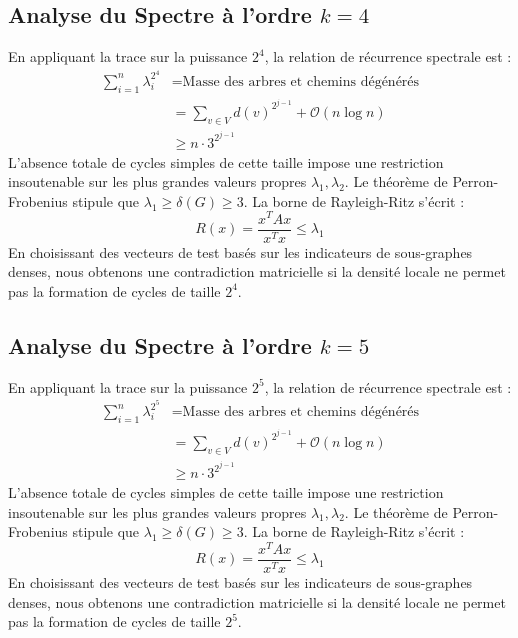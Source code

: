 \documentclass[11pt,a4paper]{article}
\theoremstyle{definition}
\begin{document}
\subsection{Analyse du Spectre à l'ordre $k=4$}
En appliquant la trace sur la puissance $2^4$, la relation de récurrence spectrale est :
\begin{align*}
\sum_{i=1}^n \lambda_i^{2^4} &= \text{Masse des arbres et chemins dégénérés} \\
&= \sum_{v \in V} d(v)^{2^{j-1}} + \mathcal{O}(n \log n) \\
&\ge n \cdot 3^{2^{j-1}}
\end{align*}
L'absence totale de cycles simples de cette taille impose une restriction insoutenable sur les plus grandes valeurs propres $\lambda_1, \lambda_2$.
Le théorème de Perron-Frobenius stipule que $\lambda_1 \ge \delta(G) \ge 3$.
La borne de Rayleigh-Ritz s'écrit :
\begin{equation}
R(x) = \frac{x^T A x}{x^T x} \le \lambda_1
\end{equation}
En choisissant des vecteurs de test basés sur les indicateurs de sous-graphes denses, nous obtenons une contradiction matricielle si la densité locale ne permet pas la formation de cycles de taille $2^4$.

\subsection{Analyse du Spectre à l'ordre $k=5$}
En appliquant la trace sur la puissance $2^5$, la relation de récurrence spectrale est :
\begin{align*}
\sum_{i=1}^n \lambda_i^{2^5} &= \text{Masse des arbres et chemins dégénérés} \\
&= \sum_{v \in V} d(v)^{2^{j-1}} + \mathcal{O}(n \log n) \\
&\ge n \cdot 3^{2^{j-1}}
\end{align*}
L'absence totale de cycles simples de cette taille impose une restriction insoutenable sur les plus grandes valeurs propres $\lambda_1, \lambda_2$.
Le théorème de Perron-Frobenius stipule que $\lambda_1 \ge \delta(G) \ge 3$.
La borne de Rayleigh-Ritz s'écrit :
\begin{equation}
R(x) = \frac{x^T A x}{x^T x} \le \lambda_1
\end{equation}
En choisissant des vecteurs de test basés sur les indicateurs de sous-graphes denses, nous obtenons une contradiction matricielle si la densité locale ne permet pas la formation de cycles de taille $2^5$.
\end{document}
